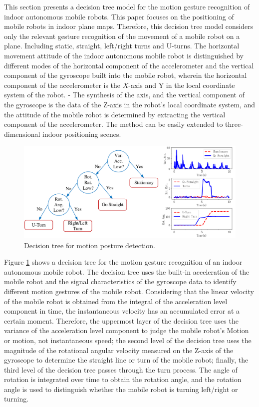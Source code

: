 \documentclass{llncs}
\begin{document}
This section presents a decision tree model for the motion gesture recognition of indoor autonomous mobile robots. This paper focuses on the positioning of mobile robots in indoor plane maps. Therefore, this decision tree model considers only the relevant gesture recognition of the movement of a mobile robot on a plane. Including static, straight, left/right turns and U-turns.
The horizontal movement attitude of the indoor autonomous mobile robot is distinguished by different modes of the horizontal component of the accelerometer and the vertical component of the gyroscope built into the mobile robot, wherein the horizontal component of the accelerometer is the $X$-axis and Y in the local coordinate system of the robot. - The synthesis of the axis, and the vertical component of the gyroscope is the data of the Z-axis in the robot's local coordinate system, and the attitude of the mobile robot is determined by extracting the vertical component of the accelerometer. The method can be easily extended to three-dimensional indoor positioning scenes.

\begin{figure}[!htbp]
	\centering
	\includegraphics[width=4.95in]{RobotMatch-ActivityDecision}
	\caption{Decision tree for motion posture detection.}
	\label{fig-posture}
\end{figure}


Figure \ref{fig-posture} shows a decision tree for the motion gesture recognition of an indoor autonomous mobile robot. The decision tree uses the built-in acceleration of the mobile robot and the signal characteristics of the gyroscope data to identify different motion gestures of the mobile robot. Considering that the linear velocity of the mobile robot is obtained from the integral of the acceleration level component in time, the instantaneous velocity has an accumulated error at a certain moment. Therefore, the uppermost layer of the decision tree uses the variance of the acceleration level component to judge the mobile robot's Motion or motion, not instantaneous speed; the second level of the decision tree uses the magnitude of the rotational angular velocity measured on the Z-axis of the gyroscope to determine the straight line or turn of the mobile robot; finally, the third level of the decision tree passes through the turn process. The angle of rotation is integrated over time to obtain the rotation angle, and the rotation angle is used to distinguish whether the mobile robot is turning left/right or turning.
\end{document}
